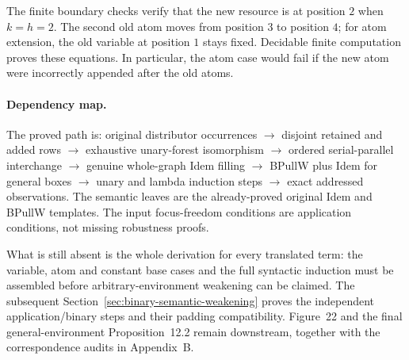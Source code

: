 The finite boundary checks verify that the new resource is at position $2$
when $k=h=2$. The second old atom moves from position $3$ to position $4$;
for atom extension, the old variable at position $1$ stays fixed. Decidable
finite computation proves these equations. In particular, the atom case
would fail if the new atom were incorrectly appended after the old atoms.

\paragraph{Dependency map.}
The proved path is: original distributor occurrences $\to$ disjoint retained
and added rows $\to$ exhaustive unary-forest isomorphism $\to$ ordered
serial-parallel interchange $\to$ genuine whole-graph Idem filling
$\to$ BPullW plus Idem for general boxes $\to$ unary and lambda induction
steps $\to$ exact addressed observations. The semantic leaves are the
already-proved original Idem and BPullW templates. The input focus-freedom
conditions are application conditions, not missing robustness proofs.

What is still absent is the whole derivation for every translated term:
the variable, atom and constant base cases and the full syntactic induction
must be assembled before arbitrary-environment weakening can be claimed.
The subsequent Section~\ref{sec:binary-semantic-weakening} proves the
independent application/binary steps and their padding compatibility. Figure~22 and the final general-environment Proposition~12.2
remain downstream, together with the correspondence audits in Appendix~B.
